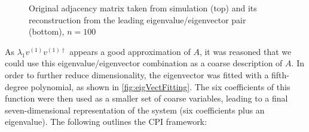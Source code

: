 \documentclass[11pt]{article}
\begin{document}
\begin{figure}
  \centering
  \caption{Original adjacency matrix taken from simulation (top) and its reconstruction from the leading eigenvalue/eigenvector pair (bottom), $n=100$}
  \label{fig:adjRecon}
\end{figure}
 
As $\lambda_{1}v^{(1)}v^{(1) \dagger}$ appears a good approximation of $A$, it was reasoned that we could use this eigenvalue/eigenvector combination as a coarse description of $A$. In order to further reduce dimensionality, the eigenvector was fitted with a fifth-degree polynomial, as shown in \ref{fig:eigVectFitting}. The six coefficients of this function were then used as a smaller set of coarse variables, leading to a final seven-dimensional representation of the system (six coefficients plus an eigenvalue). The following outlines the CPI framework:
\end{document}
